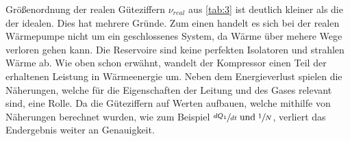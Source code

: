 \justifying Größenordnung der realen Güteziffern $\nu_{real}$ aus \ref{tab:3} ist deutlich kleiner als die der idealen. 
Dies hat mehrere Gründe. Zum einen handelt es sich bei der realen Wärmepumpe nicht um ein geschlossenes System, da Wärme über mehere Wege 
verloren gehen kann. Die Reservoire sind keine perfekten Isolatoren und strahlen Wärme ab. Wie oben schon erwähnt, wandelt der Kompressor einen
Teil der erhaltenen Leistung in Wärmeenergie um.
Neben dem Energieverlust spielen die Näherungen, welche für die Eigenschaften der Leitung und des Gases relevant sind, eine Rolle. Da die Güteziffern
auf Werten aufbauen, welche mithilfe von Näherungen berechnet wurden, wie zum Beispiel $\sfrac{dQ_1}{dt}\; \text{und}\; \sfrac{1}{N}$, verliert das 
Endergebnis weiter an Genauigkeit. 


\newpage
\printbibliography



